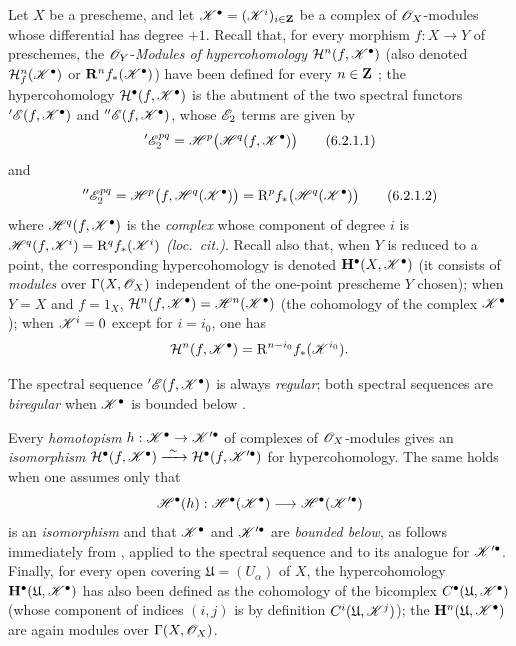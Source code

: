 \begin{env}[6.2.1]
\label{III.6.2.1}
Let $X$ be a prescheme, and let
$\mathscr{K}^\bullet=(\mathscr{K}^i)_{i\in\mathbf{Z}}$ be a complex of
$\mathscr{O}_X$-modules whose differential has degree $+1$.
Recall that, for every morphism $f:X\to Y$ of preschemes, the
$\mathscr{O}_Y$-\emph{Modules of hypercohomology}
$\mathcal{H}^n(f,\mathscr{K}^\bullet)$ (also denoted
$\mathcal{H}_f^n(\mathscr{K}^\bullet)$ or
$\mathbf{R}^n f_*(\mathscr{K}^\bullet)$) have been defined for every
$n\in\mathbf{Z}$ ; the hypercohomology
$\mathcal{H}^\bullet(f,\mathscr{K}^\bullet)$ is the abutment of
the two spectral functors
$'\mathscr{E}(f,\mathscr{K}^\bullet)$ and
$''\mathscr{E}(f,\mathscr{K}^\bullet)$, whose $\mathscr{E}_2$ terms are given by
\[
  '\mathscr{E}_2^{pq}
  =
  \mathscr{H}^p\bigl(\mathscr{H}^q(f,\mathscr{K}^\bullet)\bigr)
  \tag{6.2.1.1}\label{III.6.2.1.1}
\]
and
\[
  ''\mathscr{E}_2^{pq}
  =
  \mathscr{H}^p\bigl(f,\mathscr{H}^q(\mathscr{K}^\bullet)\bigr)
  =
  \mathrm{R}^p f_*\bigl(\mathscr{H}^q(\mathscr{K}^\bullet)\bigr)
  \tag{6.2.1.2}\label{III.6.2.1.2}
\]
where $\mathscr{H}^q(f,\mathscr{K}^\bullet)$ is the \emph{complex} whose component
of degree $i$ is $\mathscr{H}^q(f,\mathscr{K}^i)=\mathrm{R}^q f_*(\mathscr{K}^i)$
\emph{(loc.\ cit.)}.  Recall also that, when $Y$ is reduced to a
point, the corresponding hypercohomology is denoted
$\mathbf{H}^\bullet(X,\mathscr{K}^\bullet)$ (it consists of \emph{modules}
over $\Gamma(X,\mathscr{O}_X)$ independent of the one-point
prescheme $Y$ chosen); when $Y=X$ and $f=1_X$, $\mathcal{H}^n(f,\mathscr{K}^\bullet)
=
\mathscr{H}^n(\mathscr{K}^\bullet)$
(the cohomology of the complex $\mathscr{K}^\bullet$); when
$\mathscr{K}^i=0$ except for $i=i_0$, one has
\[
  \mathcal{H}^n(f,\mathscr{K}^\bullet)
  =
  \mathrm{R}^{n-i_0}f_*(\mathscr{K}^{i_0}).
\]

The spectral sequence $'\mathscr{E}(f,\mathscr{K}^\bullet)$ is always
\emph{regular}; both spectral sequences are \emph{biregular} when
$\mathscr{K}^\bullet$ is bounded below .

Every \emph{homotopism}
$h:\mathscr{K}^\bullet\to\mathscr{K}'^\bullet$ of complexes of
$\mathscr{O}_X$-modules  gives an \emph{isomorphism} $\mathcal{H}^\bullet(f,\mathscr{K}^\bullet)
\xrightarrow{\ \sim\ }
\mathcal{H}^\bullet(f,\mathscr{K}'^\bullet)$
for hypercohomology.  The same holds when one assumes only
that
\[
  \mathscr{H}^\bullet(h):
  \mathscr{H}^\bullet(\mathscr{K}^\bullet)
  \longrightarrow
  \mathscr{H}^\bullet(\mathscr{K}'^\bullet)
\]
is an \emph{isomorphism} and that $\mathscr{K}^\bullet$ and $\mathscr{K}'^\bullet$
are \emph{bounded below}, as follows immediately from , applied to the
spectral sequence  and to its analogue for
$\mathscr{K}'^\bullet$.  Finally, for every open covering
$\mathfrak{U}=(U_\alpha)$ of $X$, the hypercohomology
$\mathbf{H}^\bullet(\mathfrak{U},\mathscr{K}^\bullet)$ has also been
defined  as the cohomology of the bicomplex
$C^\bullet(\mathfrak{U},\mathscr{K}^\bullet)$ (whose component
of indices $(i,j)$ is by definition
$C^i(\mathfrak{U},\mathscr{K}^j)$); the
$\mathbf{H}^n(\mathfrak{U},\mathscr{K}^\bullet)$ are again modules over
$\Gamma(X,\mathscr{O}_X)$.
\end{env}


